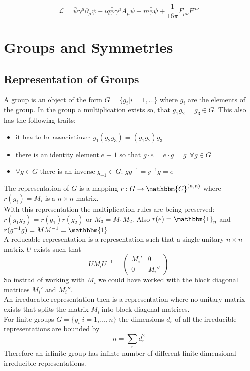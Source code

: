 \documentclass{include/thesisclass}
\newcommand{\LL}{\mathcal{L}}
\newcommand{\cc}{\cdot}
\newcommand{\df}{\rightarrow}
\newcommand{\ehm}{\mathbbm{1}}
\newcommand{\p}{\partial}
\newcommand{\Matz}[4]{\begin{pmatrix}#1&#2\\#3&#4\end{pmatrix}}
\begin{document}
\[
\LL = \bar{\psi} \gamma^\mu \p_\mu \psi + i q \bar{\psi} \gamma^\mu A_\mu \psi + m \bar{\psi}\psi + \frac{1}{16 \pi} F_{\mu\nu}F^{\mu\nu}
\]
%

\chapter{Groups and Symmetries}
\section{Representation of Groups}
A group is an object of the form $G = \{ g_i | i = 1,\ldots\}$ where $g_i$ are the elements of the group. In the group a multiplication exists so, that $g_1 g_2 = g_3 \in G$. This also has the following traits:
\begin{itemize}
\item it has to be associatiove: $g_1(g_2g_3) = (g_1g_2)g_3$
\item there is an identity element $e \equiv 1$ so that $g\cc e = e \cc g = g ~~\forall g \in G$
\item $\forall g \in G$ there is an inverse $g_{-1} \in G$: $gg^{-1} = g^{-1}g = e$
\end{itemize}
The representation of $G$ is a mapping $r: G \df \mathbbm{C}^{(n,n)}$ where $r(g_i) = M_i$ is a $n\times n$-matrix.\\
With this representation the multiplication rules are being preserved: $r(g_1g_2) = r(g_1)r(g_2)$ or $M_3 = M_1M_2$. Also $r(e) = \ehm_n$ and $r(g^{-1}g) = MM^{-1} = \ehm$.\\
A reducable representation is a representation such that a single unitary $n\times n$ matrix $U$ exists such that
\[ U M_i U^{-1} = \Matz{M_i'}{0}{0}{M_i''}\]
So instrad of working with $M_i$ we could have worked with the block diagonal matrices $M_i'$ and $M_i''$.\\
An irreducable representation then is a representation where no unitary matrix exists that splits the matrix $M_i$ into block diagonal matrices.\\
For finite groups $G = \{ g_i | i = 1, \ldots, n \}$ the dimensions $d_r$ of all the irreducible representations are bounded by 
\[n = \sum_r d_r^2\]
Therefore an infinite group has infinte number of different finite dimensional irreducible representations.
\end{document}
